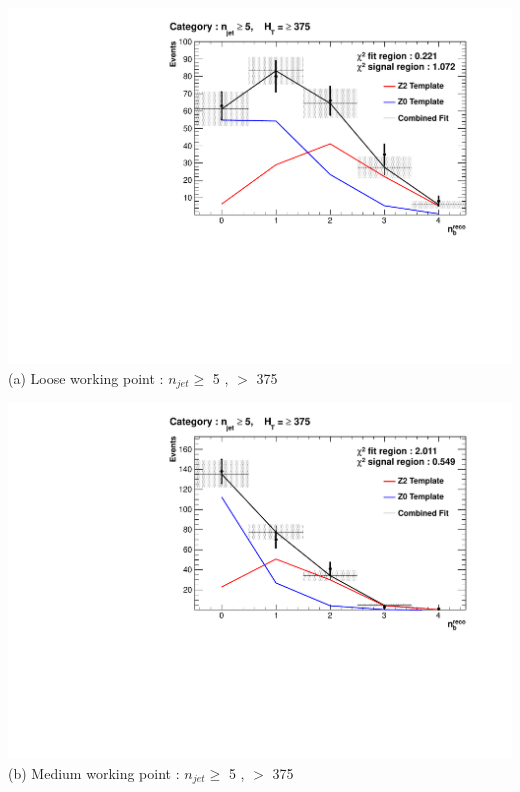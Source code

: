\begin{minipage}{\textwidth}
\footnotesize
\centering
\begin{minipage}[b]{0.51\linewidth}
\includegraphics[width = 1.0\linewidth]{plots/TemplatesSignal/Final_Fit_To_Data_Normal_Loose_HTBin_Template_375_jet_mult_5.pdf}
\centering (a) Loose working point : $n_{jet} \geq$  5 , \theht $>$ 375
\end{minipage}
\footnotesize
\begin{minipage}[b]{0.51\linewidth}
\includegraphics[width = 1.0\linewidth]{plots/TemplatesSignal/Final_Fit_To_Data_Normal_Medium_HTBin_Template_375_jet_mult_5.pdf}
\centering (b) Medium working point : $n_{jet} \geq$ 5 , \theht $>$ 375 
\end{minipage}
\end{minipage}
